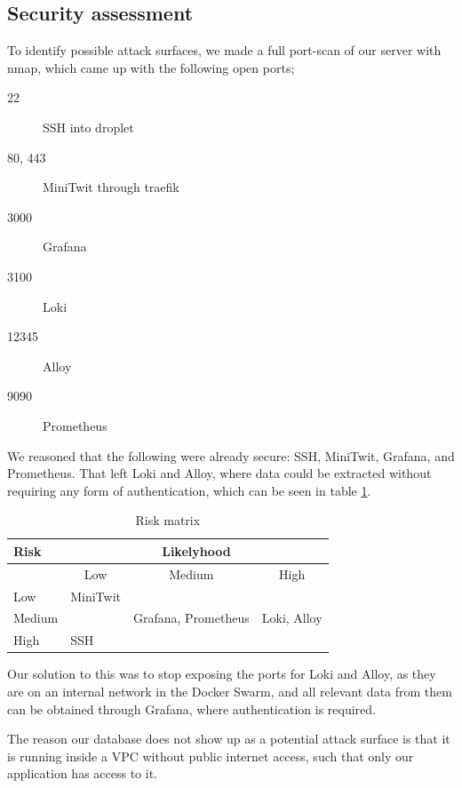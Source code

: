 \subsection{Security assessment}
To identify possible attack surfaces, we made a full port-scan of our server with nmap, which came up with the following open ports;
\begin{description}
    \item[22] SSH into droplet
    \item[80, 443] MiniTwit through traefik
    \item[3000] Grafana
    \item[3100] Loki
    \item[12345] Alloy
    \item[9090] Prometheus
\end{description}
We reasoned that the following were already secure: SSH, MiniTwit, Grafana, and Prometheus. That left Loki and Alloy, where data could be extracted without requiring any form of authentication, which can be seen in table \ref{tab:risk-matrix}. 
\begin{table}[h!]
\centering
\begin{tabular}{|l|lll|}
\hline
\textbf{Risk}   & \multicolumn{3}{c|}{\textbf{Likelyhood}}                                                                    \\ \hline
       & \multicolumn{1}{c|}{Low}                 & \multicolumn{1}{c|}{Medium} & \multicolumn{1}{c|}{High} \\ \hline
Low    & \multicolumn{1}{l|}{MiniTwit}             & \multicolumn{1}{l|}{}       &                           \\ \hline
Medium & \multicolumn{1}{l|}{} & \multicolumn{1}{l|}{Grafana, Prometheus}       & Loki, Alloy               \\ \hline
High   & \multicolumn{1}{l|}{SSH}                 & \multicolumn{1}{l|}{}       &                           \\ \hline
\end{tabular}
\caption{Risk matrix}
\label{tab:risk-matrix}
\end{table}

Our solution to this was to stop exposing the ports for Loki and Alloy, as they are on an internal network in the Docker Swarm, and all relevant data from them can be obtained through Grafana, where authentication is required.

The reason our database does not show up as a potential attack surface is that it is running inside a VPC without public internet access, such that only our application has access to it.
